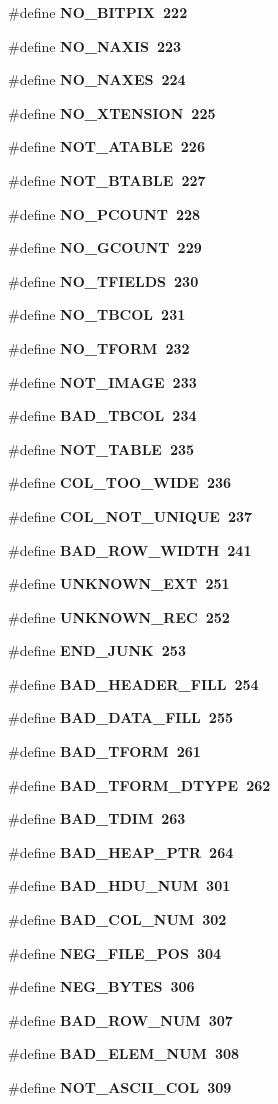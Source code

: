 \begin{CompactItemize}
\#define \bf{NO\_\-BITPIX}~222
\item 
\#define \bf{NO\_\-NAXIS}~223
\item 
\#define \bf{NO\_\-NAXES}~224
\item 
\#define \bf{NO\_\-XTENSION}~225
\item 
\#define \bf{NOT\_\-ATABLE}~226
\item 
\#define \bf{NOT\_\-BTABLE}~227
\item 
\#define \bf{NO\_\-PCOUNT}~228
\item 
\#define \bf{NO\_\-GCOUNT}~229
\item 
\#define \bf{NO\_\-TFIELDS}~230
\item 
\#define \bf{NO\_\-TBCOL}~231
\item 
\#define \bf{NO\_\-TFORM}~232
\item 
\#define \bf{NOT\_\-IMAGE}~233
\item 
\#define \bf{BAD\_\-TBCOL}~234
\item 
\#define \bf{NOT\_\-TABLE}~235
\item 
\#define \bf{COL\_\-TOO\_\-WIDE}~236
\item 
\#define \bf{COL\_\-NOT\_\-UNIQUE}~237
\item 
\#define \bf{BAD\_\-ROW\_\-WIDTH}~241
\item 
\#define \bf{UNKNOWN\_\-EXT}~251
\item 
\#define \bf{UNKNOWN\_\-REC}~252
\item 
\#define \bf{END\_\-JUNK}~253
\item 
\#define \bf{BAD\_\-HEADER\_\-FILL}~254
\item 
\#define \bf{BAD\_\-DATA\_\-FILL}~255
\item 
\#define \bf{BAD\_\-TFORM}~261
\item 
\#define \bf{BAD\_\-TFORM\_\-DTYPE}~262
\item 
\#define \bf{BAD\_\-TDIM}~263
\item 
\#define \bf{BAD\_\-HEAP\_\-PTR}~264
\item 
\#define \bf{BAD\_\-HDU\_\-NUM}~301
\item 
\#define \bf{BAD\_\-COL\_\-NUM}~302
\item 
\#define \bf{NEG\_\-FILE\_\-POS}~304
\item 
\#define \bf{NEG\_\-BYTES}~306
\item 
\#define \bf{BAD\_\-ROW\_\-NUM}~307
\item 
\#define \bf{BAD\_\-ELEM\_\-NUM}~308
\item 
\#define \bf{NOT\_\-ASCII\_\-COL}~309

\end{CompactItemize}
